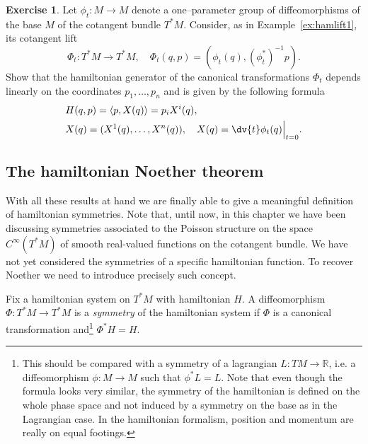 \documentclass[english,fontsize=11pt,paper=b5]{scrbook}
\theoremstyle{definition}
\newtheorem{exercise}{Exercise}[chapter]
\begin{document}
    \begin{exercise}
      Let $\phi_t:M\to M$ denote a one--parameter group of diffeomorphisms of the base  $M$ of the cotangent bundle $T^*M$.
      Consider, as in Example~\ref{ex:hamlift1}, its cotangent lift
      \begin{equation}
        \Phi_t:T^*M\to T^*M, \quad \Phi_t(q,p) = \left(\phi_t(q), \left(\phi_t^*\right)^{-1}p\right).
      \end{equation}
      Show that the hamiltonian generator of the canonical transformations $\Phi_t$ depends linearly on the coordinates $p_1, \ldots, p_n$ and is given by the following formula
      \begin{align}
     & H(q,p) = \langle p, X(q) \rangle = p_i X^i(q), \label{eq:linhamp}                   \\
     & X(q) = (X^1(q), \ldots, X^n(q)), \quad X(q) = \dv{t} \phi_t(q)\Big|_{t=0}.
      \end{align}
    \end{exercise}

    \subsection{The hamiltonian Noether theorem}

    With all these results at hand we are finally able to give a meaningful definition of hamiltonian symmetries.
    Note that, until now, in this chapter we have been discussing symmetries associated to the Poisson structure on the space $C^\infty(T^*M)$ of smooth real-valued functions on the cotangent bundle.
    We have not yet considered the symmetries of a specific hamiltonian function.
    To recover Noether we need to introduce precisely such concept.

    \begin{tcolorbox}
      Fix a hamiltonian system on $T^*M$ with hamiltonian $H$. A diffeomorphism $\Phi:T^*M\to T^* M$ is a \emph{symmetry} of the hamiltonian system if $\Phi$ is a canonical transformation and\footnote{This should be compared with a symmetry of a lagrangian $L:TM \to\mathbb{R}$, i.e. a diffeomorphism $\phi: M \to M$ such that $\phi^* L = L$. Note that even though the formula looks very similar, the symmetry of the hamiltonian is defined on the whole phase space and not induced by a symmetry on the base as in the Lagrangian case. In the hamiltonian formalism, position and momentum are really on equal footings.} $\Phi^* H = H$.
    \end{tcolorbox}
\end{document}
